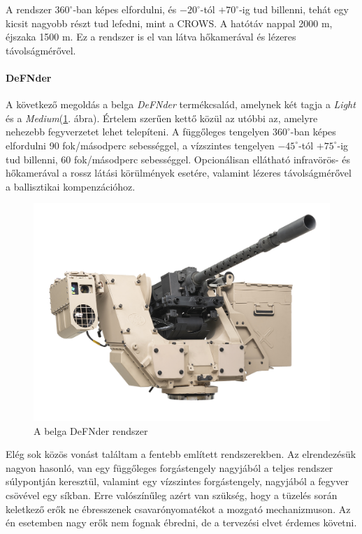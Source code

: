 \documentclass[12pt,a4paper]{article}
\begin{document}
A rendszer $360^\circ$-ban képes elfordulni, és $-20^{\circ}$-tól $+70^{\circ}$-ig tud billenni, tehát egy kicsit nagyobb részt tud lefedni, mint a CROWS. A hatótáv nappal 2000 m, éjszaka 1500 m. Ez a rendszer is el van látva hőkamerával és lézeres távolságmérővel.

\paragraph{DeFNder \cite{arbalet}}
A következő megoldás a belga \textsl{DeFNder} termékcsalád, amelynek két tagja a \textsl{Light} és a \textsl{Medium}(\ref{fig:irod_defnder}. ábra). Értelem szerűen kettő közül az utóbbi az, amelyre nehezebb fegyverzetet lehet telepíteni. A függőleges tengelyen $360^\circ$-ban képes elfordulni 90 fok/másodperc sebességgel, a vízszintes tengelyen $-45^{\circ}$-tól $+75^{\circ}$-ig tud billenni, 60 fok/másodperc sebességgel. Opcionálisan ellátható infravörös- és hőkamerával a rossz látási körülmények esetére, valamint lézeres távolságmérővel a ballisztikai kompenzációhoz.
\begin{figure}[h!]
	\centering
	\includegraphics[width=1\linewidth]{irod_defnder}
	\caption{A belga DeFNder rendszer}
	\label{fig:irod_defnder}
\end{figure}


Elég sok közös vonást találtam a fentebb említett rendszerekben. Az elrendezésük nagyon hasonló, van egy függőleges forgástengely nagyjából a teljes rendszer súlypontján keresztül, valamint egy vízszintes forgástengely, nagyjából a fegyver csövével egy síkban. Erre valószínűleg azért van szükség, hogy a tüzelés során keletkező erők ne ébresszenek csavarónyomatékot a mozgató mechanizmuson. Az én esetemben nagy erők nem fognak ébredni, de a tervezési elvet érdemes követni.
\end{document}
